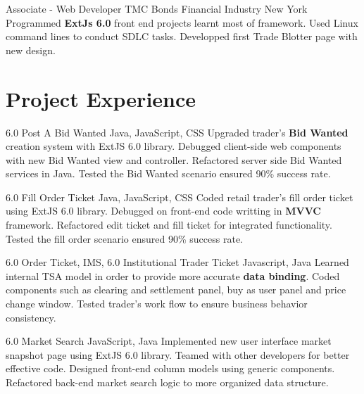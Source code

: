 \documentclass[11pt,a4paper,sans]{moderncv}   %
\begin{document}
{Associate - Web Developer}
{TMC Bonds}
{Financial Industry}
{New York}
{
	{Programmed \textbf{ExtJs 6.0} front end projects learnt most of framework.}
	\newline
	{Used Linux command lines to conduct SDLC tasks.}
	\newline
	{Developped first Trade Blotter page with new design.}
}

\section{Project Experience}
\renewcommand{\baselinestretch}{1.25}

{6.0 Post A Bid Wanted}
{Java, JavaScript, CSS}
{}{}
{
	{Upgraded trader's \textbf{Bid Wanted} creation system with ExtJS 6.0 library.}
	\newline
	{Debugged client-side web components with new Bid Wanted view and controller.}
	\newline
	{Refactored server side Bid Wanted services in Java.}
	\newline
	{Tested the Bid Wanted scenario ensured 90\% success rate.}
}

{6.0 Fill Order Ticket}
{Java, JavaScript, CSS}
{}{}
{
	{Coded retail trader's fill order ticket using ExtJS 6.0 library.}
	\newline
	{Debugged on front-end code writting in \textbf{MVVC} framework.}
	\newline
	{Refactored edit ticket and fill ticket for integrated functionality.}
	\newline
	{Tested the fill order scenario ensured 90\% success rate.}
}

{6.0 Order Ticket, IMS, 6.0 Institutional Trader Ticket}
{Javascript, Java}
{}{}
{
	{Learned internal TSA model in order to provide more accurate \textbf{data binding}.}
	\newline
	{Coded components such as clearing and settlement panel, buy as user panel and price change window.}
	\newline
	{Tested trader's work flow to ensure business behavior consistency.}
}

{6.0 Market Search}
{JavaScript, Java}
{}{}
{
	{Implemented new user interface market snapshot page using ExtJS 6.0 library.}
	\newline
	{Teamed with other developers for better effective code.}
	\newline
	{Designed front-end column models using generic components.}
	\newline
	{Refactored back-end market search logic to more organized data structure.}
}
\end{document}
